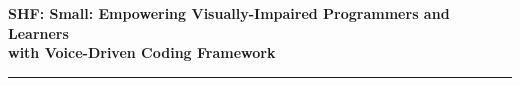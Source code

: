 \documentclass[11pt]{article}
\begin{document}
\begin{center}


{\large \bf SHF: Small: Empowering Visually-Impaired Programmers and Learners\\ with Voice-Driven Coding Framework}
\end{center}
\vspace{-.1in}
\hrule

%

%








\newpage
\setcounter{page}{1}




%
\end{document}
